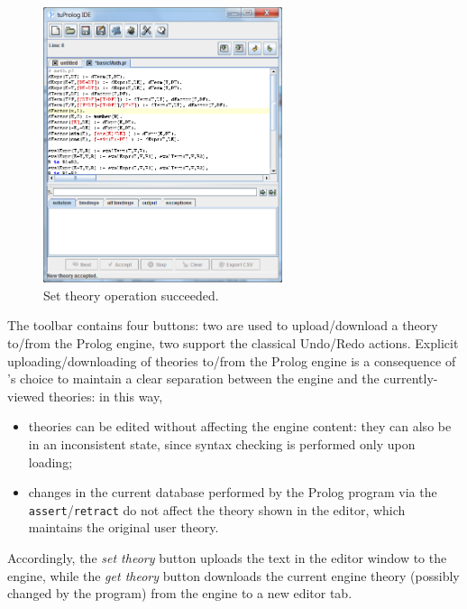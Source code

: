 \begin{figure}
\centering
\includegraphics[width=7cm]{images/setTheorySucceeded}
\caption{Set theory operation succeeded.}
\label{fig:set-theory-succeeded}
\end{figure}

The toolbar contains four buttons: two are used to upload/download a theory to/from the Prolog engine, two support the classical Undo/Redo actions.
%
Explicit uploading/downloading of theories to/from the Prolog engine is a consequence of \tuprolog{}'s choice to maintain a clear separation between the engine and the currently-viewed theories: in this way,
\begin{itemize}
  \item theories can be edited without affecting the engine content: they can also be in an inconsistent state, since syntax checking is performed only upon loading;
  \item changes in the current database performed by the Prolog program via the \texttt{assert}/\texttt{retract} do not affect the theory shown in the editor, which maintains the original user theory.
\end{itemize}
%
Accordingly, the \textit{set theory} button uploads the text in the editor window to the engine, while the \textit{get theory} button downloads the current engine theory (possibly changed by the program) from the engine to a new editor tab.

